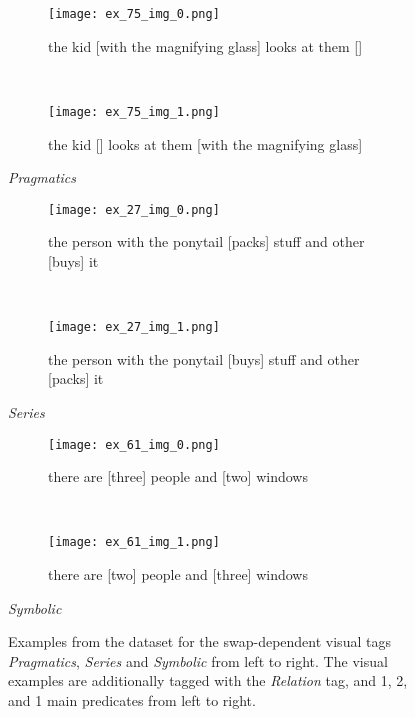 \begin{figure}
\centering
    \begin{minipage}{.30\textwidth}
        \begin{subfigure}{\textwidth}
        \centering
        \texttt{[image: ex\_75\_img\_0.png]}
        \caption{the kid [with the magnifying glass] looks at them []}
        \end{subfigure}\\
        \begin{subfigure}{\textwidth}
        \centering
        \texttt{[image: ex\_75\_img\_1.png]}
        \caption{the kid [] looks at them [with the magnifying glass]}
        \end{subfigure}%
        \caption*{\textit{Pragmatics}}
    \end{minipage}
    \hfill
    \begin{minipage}{.30\textwidth}
        \begin{subfigure}{\textwidth}
        \centering
        \texttt{[image: ex\_27\_img\_0.png]}
        \caption{the person with the ponytail [packs] stuff and other [buys] it}
        \end{subfigure}\\
        \begin{subfigure}{\textwidth}
        \centering
        \texttt{[image: ex\_27\_img\_1.png]}
        \caption{the person with the ponytail [buys] stuff and other [packs] it}
        \end{subfigure}%
        \caption*{\textit{Series}}
    \end{minipage}
    \hfill
    \begin{minipage}{.30\textwidth}
        \begin{subfigure}{\textwidth}
        \centering
        \texttt{[image: ex\_61\_img\_0.png]}
        \caption{there are [three] people and [two] windows}
        \end{subfigure}\\
        \begin{subfigure}{\textwidth}
        \centering
        \texttt{[image: ex\_61\_img\_1.png]}
        \caption{there are [two] people and [three] windows}
        \end{subfigure}%
        \caption*{\textit{Symbolic}}
    \end{minipage}
    \caption{Examples from the dataset for the swap-dependent visual tags \textit{Pragmatics}, \textit{Series} and \textit{Symbolic} from left to right. The visual examples are additionally tagged with the \textit{Relation} tag, and 1, 2, and 1 main predicates from left to right.}
    \label{fig:dataset-examples-visual}
\end{figure}

